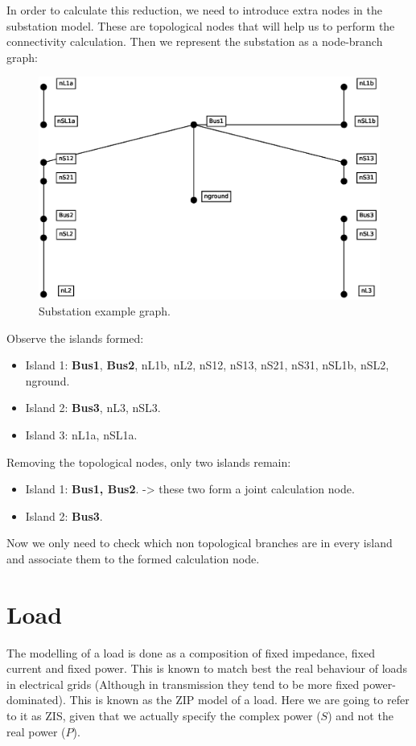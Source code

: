 \documentclass[a4paper,twoside,fleqn]{tufte-book}
\begin{document}
In order to calculate this reduction, we need to introduce extra nodes in the substation model. These are topological nodes that will help us to perform the connectivity calculation. Then we represent the substation as a node-branch graph:

\begin{center}
\begin{figure}
	\includegraphics[width=0.6\linewidth]{img/Substation_graph.eps}
	\caption{Substation example graph.}
	\label{substation_graph}
\end{figure}
\end{center}


Observe the islands formed:

\begin{itemize}
	\item Island 1: \textbf{Bus1}, \textbf{Bus2}, nL1b, nL2, nS12, nS13, nS21, nS31, nSL1b, nSL2, nground.
	\item Island 2: \textbf{Bus3}, nL3, nSL3.
	\item Island 3: nL1a, nSL1a.
\end{itemize}

Removing the topological nodes, only two islands remain:

\begin{itemize}
	\item Island 1: \textbf{Bus1, Bus2}.  -> these two form a joint calculation node.
	\item Island 2: \textbf{Bus3}.
\end{itemize}

Now we only need to check which non topological branches are in every island and associate them to the formed calculation node.

\section{Load}

The modelling of a load is done as a composition of fixed impedance, fixed current and fixed power. This is known to match best the real behaviour of loads in electrical grids (Although in transmission they tend to be more fixed power-dominated). This is known as the ZIP model of a load. Here we are going to refer to it as ZIS, given that we actually specify the complex power ($S$) and not the real power ($P$).
\end{document}
